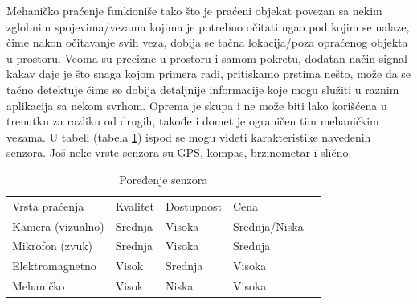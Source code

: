 \documentclass[a4paper]{article}
\begin{document}
	Mehaničko praćenje funkioniše tako što je praćeni objekat povezan sa nekim zglobnim spojevima/vezama kojima je potrebno očitati ugao pod kojim se nalaze, čime nakon očitavanje svih veza, dobija se tačna lokacija/poza opraćenog objekta u prostoru. Veoma su precizne u prostoru i samom pokretu, dodatan način signal kakav daje je što snaga kojom primera radi, pritiskamo prstima nešto, može da se tačno detektuje čime se dobija detaljnije informacije koje mogu služiti u raznim aplikacija sa nekom svrhom. Oprema je skupa i ne može biti lako korišćena u trenutku za razliku od drugih, takođe i domet je ograničen tim mehaničkim vezama. U tabeli (tabela \ref{tab:my-table}) ispod se mogu videti karakteristike navedenih senzora. Još neke vrste senzora su GPS, kompas, brzinometar i slično.\\

        \begin{table}[hbt!]
    \centering
    \caption{Poređenje senzora}
    \label{tab:my-table}
    \begin{tabular}{|l|l|l|l|l}
    \cline{1-4}
    Vrsta praćenja    & Kvalitet & Dostupnost & Cena          &  \\ \cline{1-4}
    Kamera (vizualno) & Srednja  & Visoka     & Srednja/Niska &  \\
    Mikrofon (zvuk)   & Srednja  & Visoka     & Srednja       &  \\
    Elektromagnetno   & Visok    & Srednja    & Visoka        &  \\
    Mehaničko         & Visok    & Niska      & Visoka        &  \\ \cline{1-4}
    \end{tabular}
    \end{table}
\end{document}
